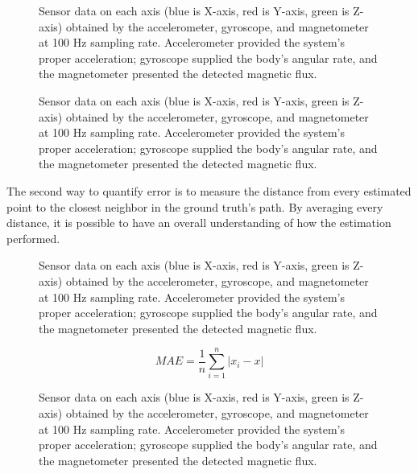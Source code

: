\begin{figure}
    \centering
    \resizebox{1\linewidth}{!}{}
    \caption{Sensor data on each axis (blue is X-axis, red is Y-axis, green is Z-axis) obtained by the accelerometer, gyroscope, and magnetometer at 100 Hz sampling rate. Accelerometer provided the system's proper acceleration; gyroscope supplied the body's angular rate, and the magnetometer presented the detected magnetic flux.}
    \label{fig:square3D}
\end{figure}

\begin{figure}
    \centering
    \resizebox{1\linewidth}{!}{}
    \caption{Sensor data on each axis (blue is X-axis, red is Y-axis, green is Z-axis) obtained by the accelerometer, gyroscope, and magnetometer at 100 Hz sampling rate. Accelerometer provided the system's proper acceleration; gyroscope supplied the body's angular rate, and the magnetometer presented the detected magnetic flux.}
    \label{fig:square3D}
\end{figure}

The second way to quantify error is to measure the distance from every estimated point to the closest neighbor in the ground truth's path. By averaging every distance, it is possible to have an overall understanding of how the estimation performed.

\begin{figure}
    \centering
    \resizebox{1\linewidth}{!}{}
    \caption{Sensor data on each axis (blue is X-axis, red is Y-axis, green is Z-axis) obtained by the accelerometer, gyroscope, and magnetometer at 100 Hz sampling rate. Accelerometer provided the system's proper acceleration; gyroscope supplied the body's angular rate, and the magnetometer presented the detected magnetic flux.}
    \label{fig:square3D}
\end{figure}

\begin{equation}
    MAE = \frac{1}{n}\sum_{i = 1}^{n} \left\lvert x_i - x\right\rvert
\end{equation}

\begin{figure}
    \centering
    \resizebox{1\linewidth}{!}{}
    \caption{Sensor data on each axis (blue is X-axis, red is Y-axis, green is Z-axis) obtained by the accelerometer, gyroscope, and magnetometer at 100 Hz sampling rate. Accelerometer provided the system's proper acceleration; gyroscope supplied the body's angular rate, and the magnetometer presented the detected magnetic flux.}
    \label{fig:square3D}
\end{figure}